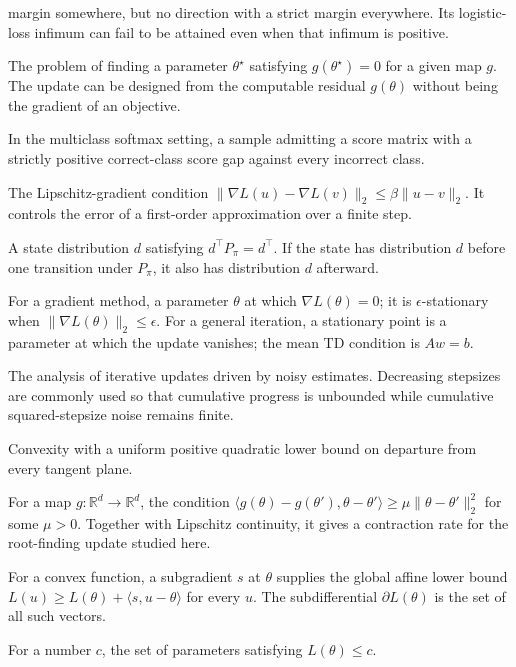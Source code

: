 \documentclass[11pt,twoside]{article}
\newcommand{\R}{\mathbb R}
\theoremstyle{definition}
\theoremstyle{remark}
\begin{document}
\begin{description}[style=nextline,leftmargin=1.5em,labelindent=0pt]
margin somewhere, but no direction with a strict margin everywhere. Its
logistic-loss infimum can fail to be attained even when that infimum is
positive.
\item[Root-finding problem]
The problem of finding a parameter $\theta^\star$ satisfying
$g(\theta^\star)=0$ for a given map $g$. The update can be designed from the
computable residual $g(\theta)$ without being the gradient of an objective.
\item[Separable sample]
In the multiclass softmax setting, a sample admitting a score matrix with a
strictly positive correct-class score gap against every incorrect class.
\item[Smoothness]
The Lipschitz-gradient condition
$\|\nabla L(u)-\nabla L(v)\|_2\le\beta\|u-v\|_2$. It controls the error of a
first-order approximation over a finite step.
\item[Stationary distribution]
A state distribution $d$ satisfying $d^\top P_\pi=d^\top$. If the state has
distribution $d$ before one transition under $P_\pi$, it also has distribution
$d$ afterward.
\item[Stationary point]
For a gradient method, a parameter $\theta$ at which $\nabla L(\theta)=0$; it
is $\epsilon$-stationary when $\|\nabla L(\theta)\|_2\le\epsilon$. For a
general iteration, a stationary point is a parameter at which the update
vanishes; the mean TD condition is $Aw=b$.
\item[Stochastic approximation]
The analysis of iterative updates driven by noisy estimates. Decreasing
stepsizes are commonly used so that cumulative progress is unbounded while
cumulative squared-stepsize noise remains finite.
\item[Strong convexity]
Convexity with a uniform positive quadratic lower bound on departure from
every tangent plane.
\item[Strong monotonicity]
For a map $g:\R^d\to\R^d$, the condition
$\langle g(\theta)-g(\theta'),\theta-\theta'\rangle
\ge\mu\|\theta-\theta'\|_2^2$ for some $\mu>0$. Together with Lipschitz
continuity, it gives a contraction rate for the root-finding update studied
here.
\item[Subgradient and subdifferential]
For a convex function, a subgradient $s$ at $\theta$ supplies the global affine
lower bound
$L(u)\ge L(\theta)+\langle s,u-\theta\rangle$ for every $u$. The
subdifferential $\partial L(\theta)$ is the set of all such vectors.
\item[Sublevel set]
For a number $c$, the set of parameters satisfying $L(\theta)\le c$.

\end{description}
\end{document}
